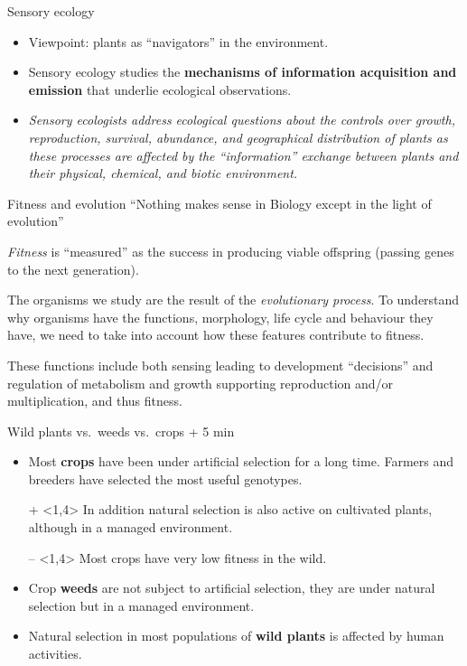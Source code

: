 \documentclass[10pt]{beamer}
\begin{document}
\begin{frame}{Sensory ecology}
    \begin{itemize}
        \item Viewpoint: plants as ``navigators'' in the environment.
        \item Sensory ecology studies the \textbf{mechanisms of information acquisition and emission} that underlie ecological observations.
        \item \emph{Sensory ecologists address ecological questions about
        the controls over growth, reproduction, survival, abundance,
        and geographical distribution of plants as these processes
        are affected by the ``information'' exchange between plants and their physical, chemical, and biotic environment.}
    \end{itemize}
\end{frame}

\begin{frame}{Fitness and evolution}
    \Attention ``Nothing makes sense in Biology except in the light of evolution''

    \vspace{0.5ex}
       \emph{Fitness} is ``measured'' as the success in producing viable offspring (passing genes to the next generation).

       The organisms we study are the result of the \emph{evolutionary process}. To understand why organisms have the functions, morphology, life cycle and behaviour they have, we need to take into account how these features contribute to fitness.

       These functions include both sensing leading to development ``decisions'' and regulation of metabolism and growth supporting reproduction and/or multiplication, and thus fitness.
\end{frame}

\begin{frame}{\HomeWork Wild plants vs.\ weeds vs.\ crops  + 5 min}
    \begin{itemize}

        \item<1,4> Most \textbf{crops} have been under artificial selection for a
        long time. Farmers and breeders have selected the most useful
        genotypes.

        \item[{\small +}]<1,4> In addition natural selection is also active on cultivated plants,
        although in a managed environment. \DExamples

        \item[{\small --}]<1,4> Most crops have very low fitness in the wild. \DExamples

        \item<2,4> Crop \textbf{weeds} are not subject to artificial selection,
        they are under natural selection but in a managed environment. \DExamples

        \item<3,4> Natural selection in most populations of \textbf{wild plants} is affected by human activities. \DExamples
    \end{itemize}
\end{frame}
\end{document}
